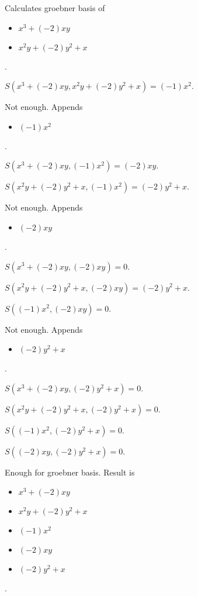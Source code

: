 \documentclass{jsarticle}
\begin{document}
Calculates groebner basis of 
\begin{itemize}
\item $x^{3}+(-2)xy$
\item $x^{2}y+(-2)y^{2}+x$
\end{itemize}  . 


$S(x^{3}+(-2)xy, x^{2}y+(-2)y^{2}+x) = (-1)x^{2}$.  

Not enough.  Appends \begin{itemize}
\item $(-1)x^{2}$
\end{itemize}  . 


$S(x^{3}+(-2)xy, (-1)x^{2}) = (-2)xy$.  

$S(x^{2}y+(-2)y^{2}+x, (-1)x^{2}) = (-2)y^{2}+x$.  

Not enough.  Appends \begin{itemize}
\item $(-2)xy$
\end{itemize}  . 


$S(x^{3}+(-2)xy, (-2)xy) = 0$.  

$S(x^{2}y+(-2)y^{2}+x, (-2)xy) = (-2)y^{2}+x$.  

$S((-1)x^{2}, (-2)xy) = 0$.  

Not enough.  Appends \begin{itemize}
\item $(-2)y^{2}+x$
\end{itemize}  . 


$S(x^{3}+(-2)xy, (-2)y^{2}+x) = 0$.  

$S(x^{2}y+(-2)y^{2}+x, (-2)y^{2}+x) = 0$.  

$S((-1)x^{2}, (-2)y^{2}+x) = 0$.  

$S((-2)xy, (-2)y^{2}+x) = 0$.  

Enough for groebner basis.  Result is \begin{itemize}
\item $x^{3}+(-2)xy$
\item $x^{2}y+(-2)y^{2}+x$
\item $(-1)x^{2}$
\item $(-2)xy$
\item $(-2)y^{2}+x$
\end{itemize}  . 
\end{document}
